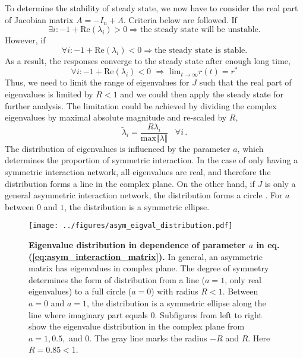 \documentclass[11pt]{article}
\begin{document}
	To determine the stability of steady state, we now have to consider the real part of Jacobian matrix $A =-I_n + \Lambda$. 
	Criteria below are followed. If
		\begin{equation*}
			\exists i: -1 + \text{Re}(\lambda_i) > 0 \Rightarrow \text{the steady state will be unstable.}
		\end{equation*}
	However, if 
		\begin{equation*}
			\forall i: -1 + \text{Re}(\lambda_i) < 0 \Rightarrow \text{the steady state is stable.}
		\end{equation*}
	As a result, the responses converge to the steady state after enough long time, 
		\begin{equation} \label{eq:asym_stable_fix_point}
			\forall i: -1 + \text{Re}(\lambda_i) < 0 \, \,  \Rightarrow \, \, \text{lim}_{t \rightarrow \infty} r(t) = r^*
		\end{equation}
	Thus, we need to limit the range of eigenvalues for $J$ such that the real part of eigenvalues is limited by $R < 1$ and we could then apply the steady state for further analysis. The limitation could be achieved by dividing the complex eigenvalues by maximal absolute magnitude and re-scaled by $R$, 
		\begin{equation} \label{eq:asym_normalization}
			\tilde{\lambda}_i = \frac{R \lambda_i}{\text{max}\Vert\lambda\Vert} \, \, \, \, \, \forall i \, .
		\end{equation}  
	The distribution of eigenvalues is influenced by the parameter $a$, which determines the proportion of symmetric interaction. In the case of only having a symmetric interaction network, all eigenvalues are real, and therefore the distribution forms a line in the complex plane. On the other hand, if $J$ is only a general asymmetric interaction network, the distribution forms a circle \cite{rajan2006eigenvalue}. For $a$ between $0$ and $1$, the distribution is a symmetric ellipse. 
		\begin{figure} [H]
			\centering
			\texttt{[image: ../figures/asym\_eigval\_distribution.pdf]}
			\caption[Eigenvalue distribution in dependence of parameter $a$ in eq.(\ref{eq:asym_interaction_matrix})]{\textbf{Eigenvalue distribution in dependence of parameter $a$ in eq.(\ref{eq:asym_interaction_matrix}).} In general, an asymmetric matrix has eigenvalues in complex plane. The degree of symmetry determines the form of distribution from a line ($a = 1$, only real eigenvalues) to a full circle ($a = 0$) with radius $R < 1$. Between $a = 0$ and $a = 1$, the distribution is a symmetric ellipse along the line where imaginary part equals $0$. Subfigures from left to right show the eigenvalue distribution in the complex plane from $a = 1, 0.5,$ and $0$. The gray line marks the radius $-R$ and $R$. Here $R = 0.85 < 1$.}
		\end{figure}
	
\end{document}
